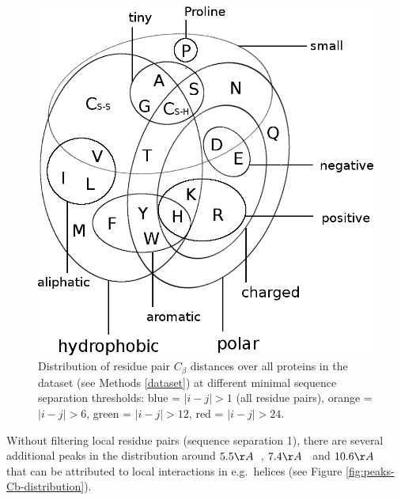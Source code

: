 \documentclass[12pt,a4paper,twoside]{book}
\newcommand{\Cb}{C_\beta}
\theoremstyle{definition}
\theoremstyle{definition}
\theoremstyle{remark}
\begin{document}
\begin{figure}
\includegraphics[width=1\linewidth]{img/amino_acid_physico_chemical_properties_venn_diagramm} \caption{Distribution of residue pair \(\Cb\)
distances over all proteins in the dataset (see Methods \ref{dataset})
at different minimal sequence separation thresholds: blue =
\(|i-j| > 1\) (all residue pairs), orange = \(|i-j| > 6\), green =
\(|i-j| > 12\), red = \(|i-j| > 24\).}\label{fig:Cb-distribution}
\end{figure}

Without filtering local residue pairs (sequence separation 1), there are
several additional peaks in the distribution around \(5.5\AA \; \;\),
\(7.4\AA \; \;\) and \(10.6\AA \; \;\) that can be attributed to local
interactions in e.g.~helices (see Figure
\ref{fig:peaks-Cb-distribution}).
\end{document}
